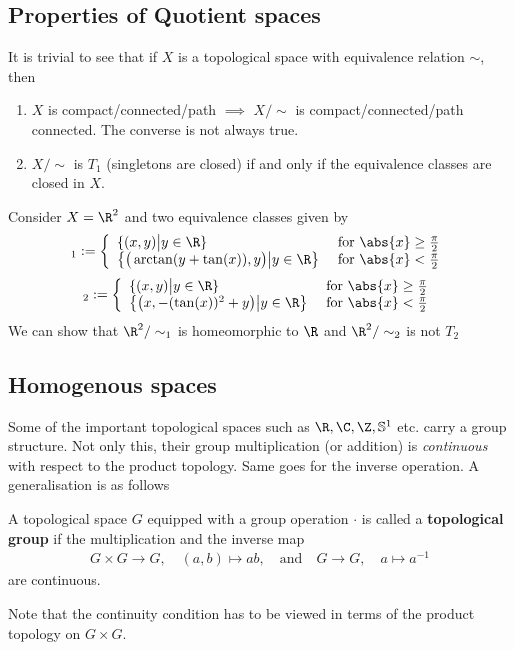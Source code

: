 \subsection{Properties of Quotient spaces}
It is trivial to see that if $X$ is a topological space with equivalence relation $\sim$, then
\begin{enumerate}
  \item $X$ is compact/connected/path $\implies$ $X/\sim$ is compact/connected/path connected.
    The converse is not always true.
  \item $X/\sim$ is $T_1$ (singletons are closed) if and only if the equivalence classes are closed in $X$.
\end{enumerate}

\begin{ex}
  Consider $X = \R^{2}$ and two equivalence classes given by
  \begin{align*}
    [x]_1 := 
    \left\{\begin{array}{ll}
        \{(x,y) \big\vert y \in \R\} & \text{ for } \abs{x} \geq \frac{\pi}{2}\\
        \left\{\big(\arctan(y + \tan(x)),y\big) \big\vert y \in \R\right\}& 
        \text{ for } \abs{x} < \frac{\pi}{2}
    \end{array} \right.
  \end{align*}
  \begin{align*}
    [x]_2 := 
    \left\{\begin{array}{ll}
        \{(x,y) \big\vert y \in \R\} & \text{ for } \abs{x} \geq \frac{\pi}{2}\\
        \left\{\big(x, - (\tan(x))^{2} + y\big) \big\vert y \in \R\right\}& 
        \text{ for } \abs{x} < \frac{\pi}{2}
    \end{array} \right.
  \end{align*}
  We can show that $\R^{2}/\sim_1$ is homeomorphic to $\R$ and $\R^{2}/\sim_2$ is not $T_2$
\end{ex}


\subsection{Homogenous spaces}
Some of the important topological spaces such as $\R, \C,\Z, \mathbb{S}^{1}$ etc. carry a group structure.
Not only this, their group multiplication (or addition) is \emph{continuous} with respect to the product topology. 
Same goes for the inverse operation.
A generalisation is as follows
\begin{dfn}[]
  A topological space $G$ equipped with a group operation $\cdot$ is called a \textbf{topological group} if the multiplication and the inverse map
  \begin{align*}
    G \times G \to  G, \quad (a,b) \mapsto ab, \quad \text{and} \quad 
    G \to  G, \quad a \mapsto a^{-1}
  \end{align*}
  are continuous.
\end{dfn}
Note that the continuity condition has to be viewed in terms of the product topology on $G \times G$.

